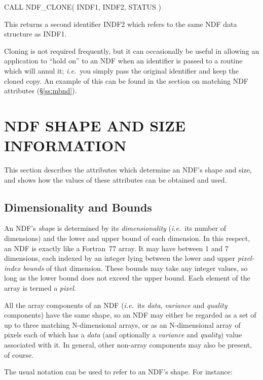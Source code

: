 \documentclass[twoside,11pt,nolof]{starlink}
\providecommand{\st}[1]{{\emph{#1}}}
\begin{document}
\small
\begin{terminalv}
      CALL NDF_CLONE( INDF1, INDF2, STATUS )
\end{terminalv}
\normalsize

This returns a second identifier INDF2 which refers to the same NDF data
structure as INDF1.

Cloning is not required frequently, but it can occasionally be useful in
allowing an application to ``hold on'' to an NDF when an identifier is passed to
a routine which will annul it; \st{i.e.}\ you simply pass the original
identifier and keep the cloned copy.
An example of this can be found in the section on matching NDF attributes
(\S\ref{ss:mbnd}).


\section{NDF SHAPE AND SIZE INFORMATION}

This section describes the attributes which determine an NDF's shape and
size, and shows how the values of these attributes can be obtained and used.

\subsection{Dimensionality and Bounds}

An NDF's \st{shape\/} is determined by its \st{dimensionality\/}
(\st{i.e.}\ its number of dimensions) and the lower and upper bound of
each
dimension.
In this respect, an NDF is exactly like a Fortran~77 array.
It may have between 1 and 7 dimensions, each indexed by an integer lying between
the lower and upper \st{pixel-index bounds\/} of that dimension.
These bounds may take any integer values, so long as the lower bound does not
exceed the upper bound.
Each element of the array is termed a \st{pixel}.

All the array components of an NDF (\st{i.e.}\ its \st{data}, \st{variance\/} and
\st{quality\/} components) have the same shape, so an NDF may either be
regarded as a set of up to three matching N-dimensional arrays, or as an
N-dimensional array of pixels each of which has a \st{data\/} (and optionally
a \st{variance\/} and \st{quality\/}) value associated with it. In general,
other non-array components may also be present, of course.

The usual notation can be used to refer to an NDF's shape.
For instance:
\end{document}

